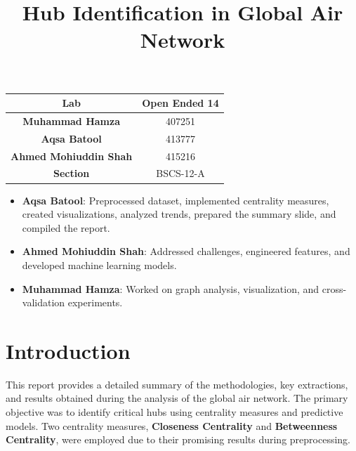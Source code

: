 \documentclass[12pt]{article}
\begin{document}
\title{Hub Identification in Global Air Network}
\author{
}
\date{}
\maketitle

\begin{table}[h!]
	\centering
	\begin{tabular}{|c|c|}
		\hline
		\textbf{Lab}                  & \textbf{Open Ended 14} \\
		\hline
		\textbf{Muhammad Hamza}       & 407251                 \\
		\hline
		\textbf{Aqsa Batool}          & 413777                 \\
		\hline
		\textbf{Ahmed Mohiuddin Shah} & 415216                 \\
		\hline
		\textbf{Section}              & BSCS-12-A              \\
		\hline
	\end{tabular}
\end{table}

\begin{itemize}
    \item \textbf{Aqsa Batool}: Preprocessed dataset, implemented centrality measures, created visualizations, analyzed trends, prepared the summary slide, and compiled the report.
    \item \textbf{Ahmed Mohiuddin Shah}: Addressed challenges, engineered features, and developed machine learning models.
    \item \textbf{Muhammad Hamza}: Worked on graph analysis, visualization, and cross-validation experiments.
\end{itemize}


\newpage

\section*{Introduction}
This report provides a detailed summary of the methodologies, key extractions, and results obtained during the analysis of the global air network. The primary objective was to identify critical hubs using centrality measures and predictive models. Two centrality measures, \textbf{Closeness Centrality} and \textbf{Betweenness Centrality}, were employed due to their promising results during preprocessing.
\end{document}
